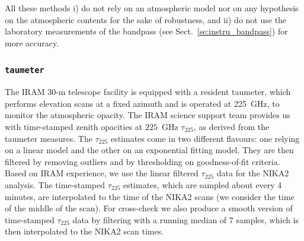 All these methods i) do not rely on an atmospheric model nor on any
hypothesis on the atmospheric contents for the sake of robustness, and
ii) do not use the laboratory measurements of the bandpass (see 
Sect.~\ref{se:instru_bandpass}) for more accuracy.  

\subsubsection{{\tt taumeter}}
\label{se:taumeter-method}

The IRAM 30-m telescope facility is equipped with a resident taumeter,
which performs elevation scans at a fixed azimuth and is operated at
225~GHz, to monitor the atmospheric opacity. The IRAM science support
team provides us with time-stamped zenith opacities at $225$~GHz
$\tau_{225}$, as derived from the taumeter measures. The
$\tau_{225}$ estimates come in two different flavours: one relying
on a linear model and the other on an exponential fitting model. They
are then filtered by removing outliers and by thresholding on
goodness-of-fit criteria.
Based on IRAM experience, we use the linear filtered $\tau_{225}$
data for the NIKA2 analysis. The time-stamped $\tau_{225}$ estimates,
which are sampled about every 4 minutes, are interpolated to the time
of the NIKA2 scans (we consider the time of the middle of the
scan). For cross-check we also produce a smooth version of time-stamped
$\tau_{225}$ data by
filtering with a running median of 7 samples, which is then
interpolated to the NIKA2 scan times.

